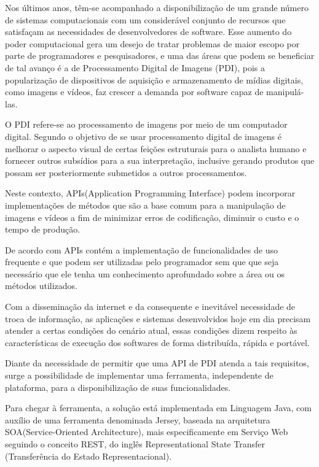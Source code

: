 \documentclass[12pt]{article}
\begin{document}
Nos últimos anos, têm-se acompanhado a disponibilização de um grande número de sistemas 
computacionais com um considerável conjunto de recursos que satisfaçam as necessidades de 
desenvolvedores de software. Esse aumento do poder computacional gera um desejo de tratar 
problemas de maior escopo por parte de programadores e pesquisadores, e uma das áreas que podem 
se beneficiar de tal avanço é a de Processamento Digital de Imagens (PDI), pois a popularização 
de dispositivos de aquisição e armazenamento de mídias digitais, como imagens e vídeos, faz 
crescer a demanda por software capaz de manipulá-las.

O PDI refere-se ao processamento de imagens por meio de um computador digital. Segundo \cite{spring} o objetivo de se usar processamento digital de imagens é melhorar o aspecto visual de certas feições estruturais para o analista humano e fornecer outros subsídios para a sua interpretação, inclusive gerando produtos que possam ser posteriormente submetidos a outros processamentos. 

Neste contexto, APIs(Application Programming Interface) podem incorporar implementações de métodos que são a base comum para a manipulação de imagens e 
vídeos a fim de minimizar erros de codificação, diminuir o custo e o tempo de produção. 

De acordo com \cite{pressman:16, sommerville:11} APIs contém a implementação de funcionalidades de uso frequente e que podem ser utilizadas pelo
programador sem que que seja necessário que ele tenha um conhecimento aprofundado sobre a área ou os métodos utilizados.

Com a disseminação da internet e da consequente e inevitável necessidade de troca de informação, 
as aplicações e sistemas desenvolvidos hoje em dia precisam 
atender a certas condições do cenário atual, essas condições dizem respeito às características 
de execução dos softwares de forma distribuída, rápida e portável. 

Diante da necessidade de permitir que uma API de PDI atenda a tais requisitos, surge a
possibilidade de implementar uma ferramenta, independente de plataforma, para a
disponibilização de suas funcionalidades.

Para chegar à ferramenta, a solução está implementada em Linguagem
Java, com auxílio de uma ferramenta denominada Jersey, baseada na arquitetura
SOA(Service-Oriented Architecture), mais especificamente em Serviço Web seguindo o conceito REST, do inglês
Representational State Transfer (Transferência do Estado Representacional). 
\end{document}
